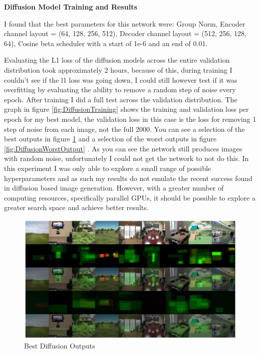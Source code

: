 \documentclass{UoYCSproject}
\begin{document}
\textbf{Diffusion Model Training and Results}

I found that the best parameters for this network were: Group Norm, Encoder channel layout = (64, 128, 256, 512), Decoder channel layout = (512, 256, 128, 64), Cosine beta scheduler with a start of 1e-6 and an end of 0.01.

Evaluating the L1 loss of the diffusion models across the entire validation distribution took approximately 2 hours, because of this, during training I couldn't see if the l1 loss was going down, I could still however test if it was overfitting by evaluating the ability to remove a random step of noise every epoch. After training I did a full test across the validation distribution. The graph in figure 
\ref{fig:DiffusionTraining}
shows the training and validation loss per epoch for my best model, the validation loss in this case is the loss for removing 1 step of noise from each image, not the full 2000. 
You can see a selection of the best outputs in figure 
\ref{fig:DiffusionBestOutputs}
and a selection of the worst outputs in figure 
\ref{fig:DiffusionWorstOutput}
. As you can see the network still produces images with random noise, unfortunately I could not get the network to not do this. In this experiment I was only able to explore a small range of possible hyperparameters and as such my results do not emulate the recent success found in diffusion based image generation. \cite{ramesh2022hierarchical, saharia2022photorealistic} However, with a greater number of computing resources, specifically parallel GPUs, it should be possible to explore a greater search space and achieve better results.

\begin{figure}[ht]
    \centering
    \includegraphics[width=\linewidth]{Diffusion Best Outputs}
    \caption{Best Diffusion Outputs}
    \label{fig:DiffusionBestOutputs}
\end{figure}
\end{document}
